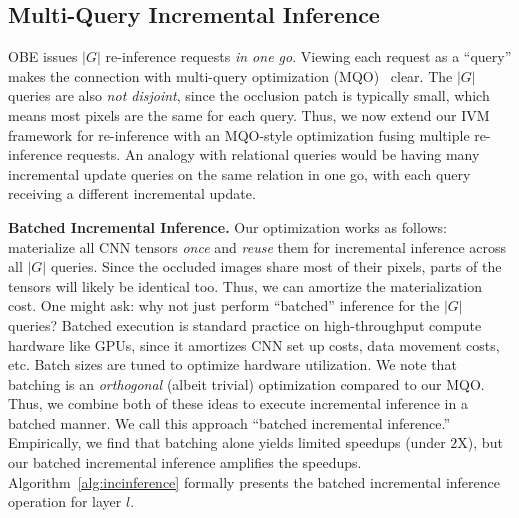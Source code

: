 \subsection{Multi-Query Incremental Inference}
OBE issues $|G|$ re-inference requests \textit{in one go}. Viewing each request as a ``query'' makes the connection with multi-query optimization (MQO)~\cite{sellis1988multiple} clear.
The $|G|$ queries are also \textit{not disjoint}, since the occlusion patch is typically small, which means most pixels are the same for each query.
Thus, we now extend our IVM framework for re-inference with an MQO-style optimization fusing multiple re-inference requests.
An analogy with relational queries would be having many incremental update queries on the same relation in one go, with each query receiving a different incremental update. 

\vspace{2mm}
\noindent \textbf{Batched Incremental Inference.}
Our optimization works as follows: materialize all CNN tensors \textit{once} and \textit{reuse} them for incremental inference across all $|G|$ queries. Since the occluded images share most of their pixels, parts of the tensors will likely be identical too. Thus, we can amortize the materialization cost. One might ask: why not just perform ``batched'' inference for the $|G|$ queries? Batched execution is standard practice on high-throughput compute hardware like GPUs, since it amortizes CNN set up costs, data movement costs, etc. Batch sizes are tuned to optimize hardware utilization. We note that batching is an \textit{orthogonal} (albeit trivial) optimization compared to our MQO. Thus, we combine both of these ideas to execute incremental inference in a batched manner. We call this approach ``batched incremental inference.'' Empirically, we find that batching alone yields limited speedups (under $2$X), but our batched incremental inference amplifies the speedups. Algorithm~\ref{alg:incinference} formally presents the batched incremental inference operation for layer $l$.

